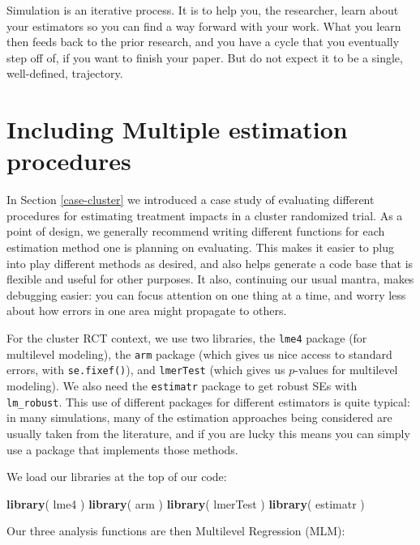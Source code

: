 \documentclass[
]{book}
\newenvironment{Shaded}{\begin{snugshade}}{\end{snugshade}}
\newcommand{\FunctionTok}[1]{\textcolor[rgb]{0.13,0.29,0.53}{\textbf{#1}}}
\newcommand{\NormalTok}[1]{#1}
\begin{document}
Simulation is an iterative process.
It is to help you, the researcher, learn about your estimators so you can find a way forward with your work.
What you learn then feeds back to the prior research, and you have a cycle that you eventually step off of, if you want to finish your paper.
But do not expect it to be a single, well-defined, trajectory.

\section{Including Multiple estimation procedures}\label{including-multiple-estimation-procedures}

In Section \ref{case-cluster} we introduced a case study of evaluating different procedures for estimating treatment impacts in a cluster randomized trial.
As a point of design, we generally recommend writing different functions for each estimation method one is planning on evaluating. This makes it easier to plug into play different methods as desired, and also helps generate a code base that is flexible and useful for other purposes.
It also, continuing our usual mantra, makes debugging easier: you can focus attention on one thing at a time, and worry less about how errors in one area might propagate to others.

For the cluster RCT context, we use two libraries, the \texttt{lme4} package (for multilevel modeling), the \texttt{arm} package (which gives us nice access to standard errors, with \texttt{se.fixef()}), and \texttt{lmerTest} (which gives us \(p\)-values for multilevel modeling).
We also need the \texttt{estimatr} package to get robust SEs with \texttt{lm\_robust}.
This use of different packages for different estimators is quite typical: in many simulations, many of the estimation approaches being considered are usually taken from the literature, and if you are lucky this means you can simply use a package that implements those methods.

We load our libraries at the top of our code:

\begin{Shaded}
\begin{Highlighting}[]
\FunctionTok{library}\NormalTok{( lme4 )}
\FunctionTok{library}\NormalTok{( arm )}
\FunctionTok{library}\NormalTok{( lmerTest )}
\FunctionTok{library}\NormalTok{( estimatr )}
\end{Highlighting}
\end{Shaded}

Our three analysis functions are then Multilevel Regression (MLM):
\end{document}
